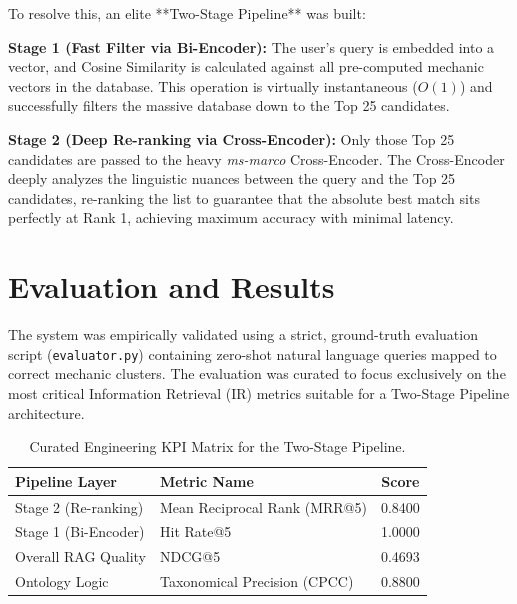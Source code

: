 \documentclass{article}
\begin{document}
To resolve this, an elite **Two-Stage Pipeline** was built:

\textbf{Stage 1 (Fast Filter via Bi-Encoder):} 
The user's query is embedded into a vector, and Cosine Similarity is calculated against all pre-computed mechanic vectors in the database. This operation is virtually instantaneous ($O(1)$) and successfully filters the massive database down to the Top 25 candidates.

\textbf{Stage 2 (Deep Re-ranking via Cross-Encoder):}
Only those Top 25 candidates are passed to the heavy \emph{ms-marco} Cross-Encoder. The Cross-Encoder deeply analyzes the linguistic nuances between the query and the Top 25 candidates, re-ranking the list to guarantee that the absolute best match sits perfectly at Rank 1, achieving maximum accuracy with minimal latency.

\section{Evaluation and Results}
\label{sec:results}
The system was empirically validated using a strict, ground-truth evaluation script (\texttt{evaluator.py}) containing zero-shot natural language queries mapped to correct mechanic clusters. The evaluation was curated to focus exclusively on the most critical Information Retrieval (IR) metrics suitable for a Two-Stage Pipeline architecture.

\begin{table}[htbp]
    \centering
    \caption{Curated Engineering KPI Matrix for the Two-Stage Pipeline.}
    \label{tab:metrics}
    \renewcommand{\arraystretch}{1.05}
    \setlength{\tabcolsep}{4.5pt}
    \begin{tabular}{llc}
        \toprule
        \textbf{Pipeline Layer} & \textbf{Metric Name} & \textbf{Score} \\
        \midrule
        Stage 2 (Re-ranking) & Mean Reciprocal Rank (MRR@5) & 0.8400 \\
        Stage 1 (Bi-Encoder) & Hit Rate@5 & 1.0000 \\
        Overall RAG Quality & NDCG@5 & 0.4693 \\
        Ontology Logic & Taxonomical Precision (CPCC) & 0.8800 \\
        \bottomrule
    \end{tabular}
\end{table}
\end{document}
